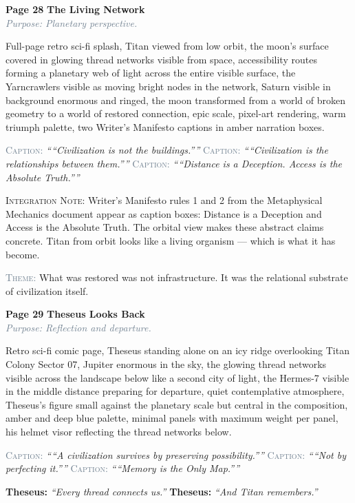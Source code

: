 \documentclass[11pt]{article}
\newcommand{\dialogue}[2]{\medskip\noindent\textbf{\textcolor{titanOrange}{#1:}} \textit{``#2''}\medskip}
\newcommand{\pagecaption}[1]{\medskip\noindent\textcolor{slateGray}{\textsc{Caption:}} \textit{``#1''}\medskip}
\newcommand{\prompt}[1]{\begin{terminal}{\small #1}\end{terminal}}
\newcommand{\theme}[1]{\medskip\noindent\textcolor{slateGray}{\textsc{Theme:}} #1\medskip}
\newcommand{\integration}[1]{\medskip\noindent\textcolor{archiveGold}{\textsc{Integration Note:}} #1\medskip}
\newcommand{\pageheading}[3]{%
  \begin{pagebox}
    \noindent\textbf{\textcolor{titanOrange}{Page #1}} \hfill \textbf{\textcolor{cyanThread}{#2}}\\[2pt]
    \noindent\textcolor{slateGray}{\textit{Purpose: #3}}
  \end{pagebox}
  \medskip
}
\begin{document}
\vspace{0.5em}

\pageheading{28}{The Living Network}{Planetary perspective.}

\prompt{Full-page retro sci-fi splash, Titan viewed from low orbit, the moon's surface covered in glowing thread networks visible from space, accessibility routes forming a planetary web of light across the entire visible surface, the Yarncrawlers visible as moving bright nodes in the network, Saturn visible in background enormous and ringed, the moon transformed from a world of broken geometry to a world of restored connection, epic scale, pixel-art rendering, warm triumph palette, two Writer's Manifesto captions in amber narration boxes.}

\pagecaption{``Civilization is not the buildings.''}
\pagecaption{``Civilization is the relationships between them.''}
\pagecaption{``Distance is a Deception. Access is the Absolute Truth.''}

\integration{Writer's Manifesto rules 1 and 2 from the Metaphysical Mechanics document appear as caption boxes: Distance is a Deception and Access is the Absolute Truth. The orbital view makes these abstract claims concrete. Titan from orbit looks like a living organism --- which is what it has become.}

\theme{What was restored was not infrastructure. It was the relational substrate of civilization itself.}

\vspace{0.5em}

\pageheading{29}{Theseus Looks Back}{Reflection and departure.}

\prompt{Retro sci-fi comic page, Theseus standing alone on an icy ridge overlooking Titan Colony Sector 07, Jupiter enormous in the sky, the glowing thread networks visible across the landscape below like a second city of light, the Hermes-7 visible in the middle distance preparing for departure, quiet contemplative atmosphere, Theseus's figure small against the planetary scale but central in the composition, amber and deep blue palette, minimal panels with maximum weight per panel, his helmet visor reflecting the thread networks below.}

\pagecaption{``A civilization survives by preserving possibility.''}
\pagecaption{``Not by perfecting it.''}
\pagecaption{``Memory is the Only Map.''}

\dialogue{Theseus}{Every thread connects us.}
\dialogue{Theseus}{And Titan remembers.}
\end{document}

